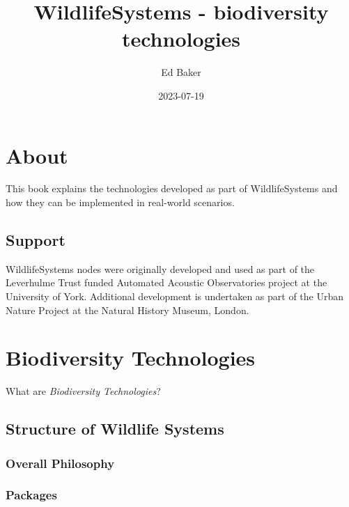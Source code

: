 \documentclass[
]{book}
\title{WildlifeSystems - biodiversity technologies}
\author{Ed Baker}
\date{2023-07-19}
\begin{document}
\maketitle

{
\setcounter{tocdepth}{1}
\tableofcontents
}
\hypertarget{about}{%
\chapter*{About}\label{about}}

This book explains the technologies developed as part of WildlifeSystems and how they can be implemented in real-world scenarios.

\hypertarget{support}{%
\section*{Support}\label{support}}

WildlifeSystems nodes were originally developed and used as part of the Leverhulme Trust funded Automated Acoustic Observatories project at the University of York. Additional development is undertaken as part of the Urban Nature Project at the Natural History Museum, London.

\hypertarget{biodiversity-technologies}{%
\chapter{Biodiversity Technologies}\label{biodiversity-technologies}}

What are \emph{Biodiversity Technologies}?

\hypertarget{structure-of-wildlife-systems}{%
\section{Structure of Wildlife Systems}\label{structure-of-wildlife-systems}}

\hypertarget{overall-philosophy}{%
\subsection{Overall Philosophy}\label{overall-philosophy}}

\hypertarget{packages}{%
\subsection{Packages}\label{packages}}
\end{document}
